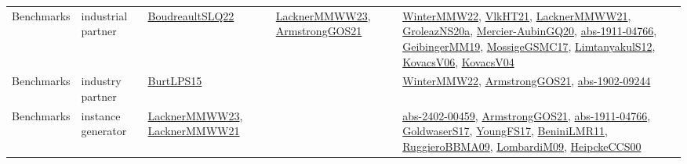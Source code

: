 {\begin{longtable}{lp{3cm}>{\raggedright}p{6cm}>{\raggedright}p{6cm}p{8cm}}
Benchmarks & industrial partner & \href{papers/BoudreaultSLQ22.pdf}{BoudreaultSLQ22}\cite{BoudreaultSLQ22} & \href{articles/LacknerMMWW23.pdf}{LacknerMMWW23}\cite{LacknerMMWW23}, \href{papers/ArmstrongGOS21.pdf}{ArmstrongGOS21}\cite{ArmstrongGOS21} & \href{papers/WinterMMW22.pdf}{WinterMMW22}\cite{WinterMMW22}, \href{articles/VlkHT21.pdf}{VlkHT21}\cite{VlkHT21}, \href{papers/LacknerMMWW21.pdf}{LacknerMMWW21}\cite{LacknerMMWW21}, \href{papers/GroleazNS20a.pdf}{GroleazNS20a}\cite{GroleazNS20a}, \href{papers/Mercier-AubinGQ20.pdf}{Mercier-AubinGQ20}\cite{Mercier-AubinGQ20}, \href{articles/abs-1911-04766.pdf}{abs-1911-04766}\cite{abs-1911-04766}, \href{papers/GeibingerMM19.pdf}{GeibingerMM19}\cite{GeibingerMM19}, \href{papers/MossigeGSMC17.pdf}{MossigeGSMC17}\cite{MossigeGSMC17}, \href{articles/LimtanyakulS12.pdf}{LimtanyakulS12}\cite{LimtanyakulS12}, \href{papers/KovacsV06.pdf}{KovacsV06}\cite{KovacsV06}, \href{papers/KovacsV04.pdf}{KovacsV04}\cite{KovacsV04}\\
Benchmarks & industry partner & \href{papers/BurtLPS15.pdf}{BurtLPS15}\cite{BurtLPS15} &  & \href{papers/WinterMMW22.pdf}{WinterMMW22}\cite{WinterMMW22}, \href{papers/ArmstrongGOS21.pdf}{ArmstrongGOS21}\cite{ArmstrongGOS21}, \href{articles/abs-1902-09244.pdf}{abs-1902-09244}\cite{abs-1902-09244}\\
Benchmarks & instance generator & \href{articles/LacknerMMWW23.pdf}{LacknerMMWW23}\cite{LacknerMMWW23}, \href{papers/LacknerMMWW21.pdf}{LacknerMMWW21}\cite{LacknerMMWW21} &  & \href{articles/abs-2402-00459.pdf}{abs-2402-00459}\cite{abs-2402-00459}, \href{papers/ArmstrongGOS21.pdf}{ArmstrongGOS21}\cite{ArmstrongGOS21}, \href{articles/abs-1911-04766.pdf}{abs-1911-04766}\cite{abs-1911-04766}, \href{papers/GoldwaserS17.pdf}{GoldwaserS17}\cite{GoldwaserS17}, \href{papers/YoungFS17.pdf}{YoungFS17}\cite{YoungFS17}, \href{articles/BeniniLMR11.pdf}{BeniniLMR11}\cite{BeniniLMR11}, \href{articles/RuggieroBBMA09.pdf}{RuggieroBBMA09}\cite{RuggieroBBMA09}, \href{papers/LombardiM09.pdf}{LombardiM09}\cite{LombardiM09}, \href{articles/HeipckeCCS00.pdf}{HeipckeCCS00}\cite{HeipckeCCS00}\\

\end{longtable}}
